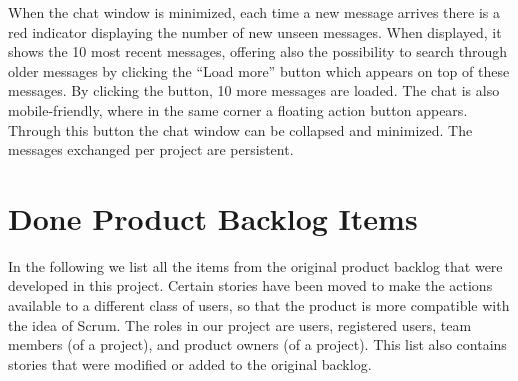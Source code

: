 \documentclass[
	accentcolor=tud1a %
]{tudreport}
\begin{document}
When the chat window is minimized, each time a new message arrives there is a red indicator displaying the number of new unseen messages. When displayed, it shows the 10 most recent messages, offering also the possibility to search through older messages by clicking the ``Load more'' button which appears on top of these messages. By clicking the button, 10 more messages are loaded. The chat is also mobile-friendly, where in the same corner a floating action button appears. Through this button the chat window can be collapsed and minimized. The messages exchanged per project are persistent. 


\chapter{Done Product Backlog Items}
\label{ch:done-pbis}

In the following we list all the items from the original product backlog that were developed in this project. Certain stories have been moved to make the actions available to a different class of users, so that the product is more compatible with the idea of Scrum. The roles in our project are users, registered users, team members (of a project), and product owners (of a project). This list also contains stories that were modified or added to the original backlog.

\end{document}

